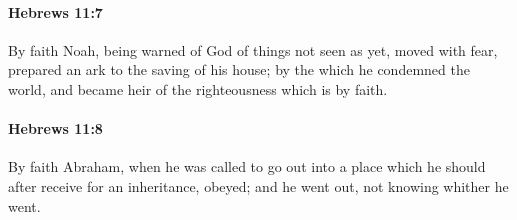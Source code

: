 		\paragraph{Hebrews 11:7} %
			\label{HEBREWS-11-7}

			By faith Noah, being warned of God of things not seen as yet, moved with fear, prepared an ark to the saving of his house; by the which he condemned the world, and became heir of the righteousness which is by faith.

			\begin{framed}
			\scriptsize
				\begin{compactdesc}
					\item[SBLG] 
				\end{compactdesc}
			\end{framed}

		\paragraph{Hebrews 11:8} %
			\label{HEBREWS-11-8}

			By faith Abraham, when he was called to go out into a place which he should after receive for an inheritance, obeyed; and he went out, not knowing whither he went.

